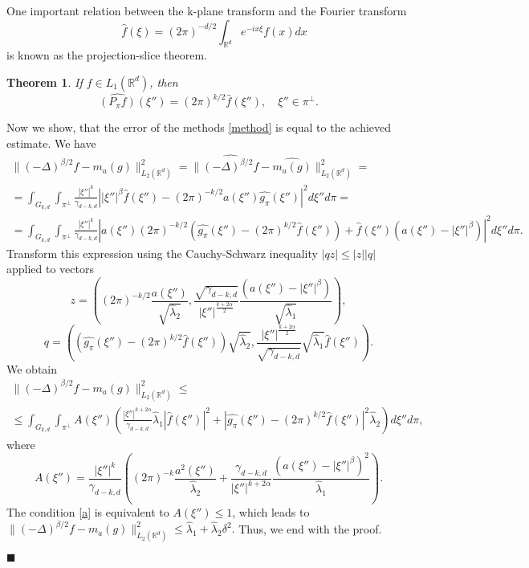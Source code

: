 \documentclass[12pt]{iopart}
\newtheorem{theorem}{Theorem}
\newenvironment{proof}
{\par\noindent{\bf Proof}}
{\hfill$\scriptstyle\blacksquare$}
\begin{document}
One important relation between the k-plane transform and the Fourier transform
$$\quad \widehat f(\xi)=(2\pi)^{-d/2}\int_{\mathbb R^d}e^{-ix\xi}f(x)dx$$
is  known as the projection-slice theorem. 

\begin{theorem}
\label{projection}
If $f\in L_1(\mathbb R^d)$, then
$$\widehat{(P_\pi f)}(\xi'')=(2\pi)^{k/2}\widehat f(\xi''),\quad \xi''\in\pi^\perp.$$
\end{theorem}

\begin{proof}
Now we show, that the error of the methods \eqref{method} is equal to the achieved estimate.
We have
\begin{multline*}
  \|(-\Delta)^{\beta/2}f-m_a(g)\|^2_{L_2(\mathbb R^d)}=\|\widehat{(-\Delta)^{\beta/2}f}-\widehat{m_a(g)}\|^2_{L_2(\mathbb R^d)}=\\
  =\int_{G_{k,d}}\int_{\pi^\perp}\frac{|\xi''|^k}{\gamma_{d-k,d}}\left||\xi''|^\beta \widehat f(\xi'')-(2\pi)^{-k/2}a(\xi'')\widehat{g_\pi}(\xi'')\right|^2d\xi'' d\pi =\\
  =\int_{G_{k,d}}\int_{\pi^\perp}\frac{|\xi''|^k}{\gamma_{d-k,d}}\left|a(\xi'')(2\pi)^{-k/2}\left(\widehat{g_\pi }(\xi'')-(2\pi)^{k/2}\widehat 
      f(\xi'' )\right)+\widehat
    f(\xi'')\left(a(\xi'')-|\xi''|^\beta\right)\right|^2d\xi'' d\pi .
\end{multline*}
Transform this expression using the Cauchy-Schwarz inequality $|qz|\leqslant |z||q|$ applied to vectors
\[
z=\left((2\pi)^{-k/2}\frac{a(\xi'')}{\sqrt{\widehat\lambda_2}},\frac{\sqrt{\gamma_{d-k,d}}}{|\xi''|^{\frac{k+2\alpha}{2}}}\frac{(a(\xi'')-|\xi''|^\beta)}{\sqrt{\widehat\lambda_1}}\right),
\]
\[
q=\left(\left(\widehat{g_\pi }(\xi'')-(2\pi)^{k/2}\widehat
    f(\xi'' )\right)\sqrt{\widehat\lambda_2},\frac{|\xi''|^{\frac{k+2\alpha}{2}}}{\sqrt{\gamma_{d-k,d}}}\sqrt{\widehat\lambda_1}\widehat
  f(\xi'' )\right).
\]
We obtain
\begin{multline*}  
  \|(-\Delta)^{\beta/2}f-m_a(g)\|^2_{L_2(\mathbb R^d)}\leqslant  \\
  \leqslant \int_{G_{k,d}}\int_{\pi^\perp}
  A(\xi'')\left(\frac{|\xi''|^{k+2\alpha}}{\gamma_{d-k,d}}\widehat\lambda_1|\widehat
    f(\xi'')|^2+\left|\widehat{g_\pi
      }(\xi'')-(2\pi)^{k/2}\widehat f(\xi''
      )\right|^2\widehat\lambda_2\right)d\xi'' d\pi ,
\end{multline*}
where
  \[
  A(\xi'')=\frac{|\xi''|^k}{\gamma_{d-k,d}}\left((2\pi)^{-k}\frac{a^2(\xi'')}{\widehat\lambda_2}+\frac{\gamma_{d-k,d}}{|\xi''|^{k+2\alpha}}\frac{(a(\xi'')-|\xi''|^\beta)^2}{\widehat\lambda_1}\right).
  \]
  The condition \eqref{a} is equivalent to $A(\xi'')\leqslant 1$, which leads to $ \|(-\Delta)^{\beta/2}f-m_a(g)\|^2_{L_2(\mathbb R^d)}\leqslant
  \widehat\lambda_1+\widehat\lambda_2\delta^2.$
Thus, we end with the proof.

\end{proof}
\end{document}
